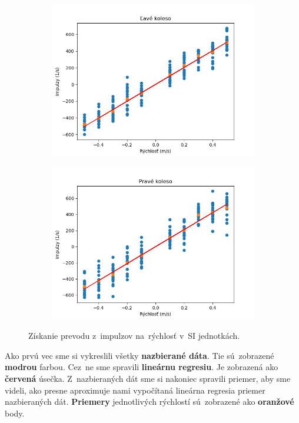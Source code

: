 \begin{figure}[!htbp]
	\begin{subfigure}{0.5\textwidth}
		\includegraphics[width=\textwidth]{img/lw_nf.png}
	\end{subfigure}
	\hfill
	\begin{subfigure}{0.5\textwidth}
		\includegraphics[width=\textwidth]{img/rw_nf.png}
	\end{subfigure}
	\caption{Získanie prevodu z~impulzov na~rýchlosť v~SI jednotkách.}
	\label{fig:rw_lw_nf}
\end{figure}

Ako prvú vec sme si vykreslili všetky \textbf{nazbierané dáta}. Tie sú~zobrazené \textbf{modrou} farbou. Cez~ne sme spravili \textbf{lineárnu regresiu}. Je zobrazená
ako \textbf{červená} úsečka. Z~nazbieraných dát sme si nakoniec spravili priemer, aby sme videli, ako presne aproximuje nami vypočítaná lineárna regresia priemer
nazbieraných dát. \textbf{Priemery} jednotlivých rýchlostí sú~zobrazené ako \textbf{oranžové} body.

